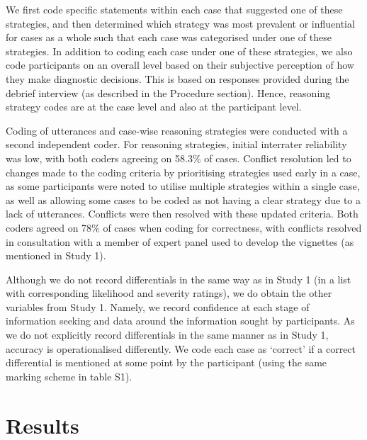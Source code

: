 \documentclass[a4paper, nobind]{templates/ociamthesis}
\begin{document}
We first code specific statements within each case that suggested one of these strategies, and then determined which strategy was most prevalent or influential for cases as a whole such that each case was categorised under one of these strategies. In addition to coding each case under one of these strategies, we also code participants on an overall level based on their subjective perception of how they make diagnostic decisions. This is based on responses provided during the debrief interview (as described in the Procedure section). Hence, reasoning strategy codes are at the case level and also at the participant level.

Coding of utterances and case-wise reasoning strategies were conducted with a second independent coder. For reasoning strategies, initial interrater reliability was low, with both coders agreeing on 58.3\% of cases. Conflict resolution led to changes made to the coding criteria by prioritising strategies used early in a case, as some participants were noted to utilise multiple strategies within a single case, as well as allowing some cases to be coded as not having a clear strategy due to a lack of utterances. Conflicts were then resolved with these updated criteria. Both coders agreed on 78\% of cases when coding for correctness, with conflicts resolved in consultation with a member of expert panel used to develop the vignettes (as mentioned in Study 1).

Although we do not record differentials in the same way as in Study 1 (in a list with corresponding likelihood and severity ratings), we do obtain the other variables from Study 1. Namely, we record confidence at each stage of information seeking and data around the information sought by participants. As we do not explicitly record differentials in the same manner as in Study 1, accuracy is operationalised differently. We code each case as `correct' if a correct differential is mentioned at some point by the participant (using the same marking scheme in table S1).

\hypertarget{results-1}{%
\section*{Results}\label{results-1}}
\end{document}
